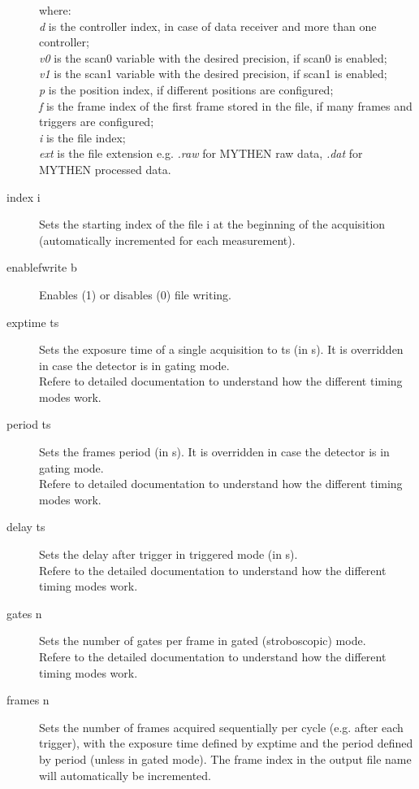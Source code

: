 \documentclass{article}
\begin{document}
\begin{description}
where: \\
\textit{d} is the controller index, in case of data receiver and more than one controller;\\
\textit{v0} is the scan0 variable with the desired precision, if scan0 is enabled;\\
\textit{v1} is the scan1 variable with the desired precision, if scan1 is enabled;\\
\textit{p} is the position index, if different positions are configured;\\
\textit{f} is the frame index of the first frame stored in the file, if many frames and triggers are configured;\\
\textit{i} is the file index;\\
\textit{ext} is the file extension e.g. \textit{.raw} for MYTHEN raw data, \textit{.dat} for MYTHEN processed data.
\item[index i] Sets the starting index of the file i at the beginning of the acquisition (automatically incremented for each measurement).    
\item[enablefwrite b] Enables (1) or disables (0) file writing. 
\item[exptime ts] 
Sets the exposure time of a single acquisition to ts (in s). It is overridden in case the detector is in gating mode.  \\
Refere to detailed documentation to understand how the different timing modes work.
\item[period ts]  
Sets the frames period (in s). It is overridden in case the detector is in gating mode. \\
Refere to detailed documentation to understand how the different timing modes work. 
\item[delay ts] 
Sets the delay after trigger in triggered mode (in s).\\
Refere to the detailed documentation to understand how the different timing modes work.
\item[gates n] 
Sets the number of gates per frame in gated (stroboscopic) mode.\\
Refere to the detailed documentation to understand how the different timing modes work.
\item[frames n]  
Sets the number of frames acquired sequentially per cycle (e.g. after each trigger), with the exposure time defined by exptime and the period defined by period (unless in gated mode). The frame index in the output file name will automatically be incremented.\\

\end{description}
\end{document}
